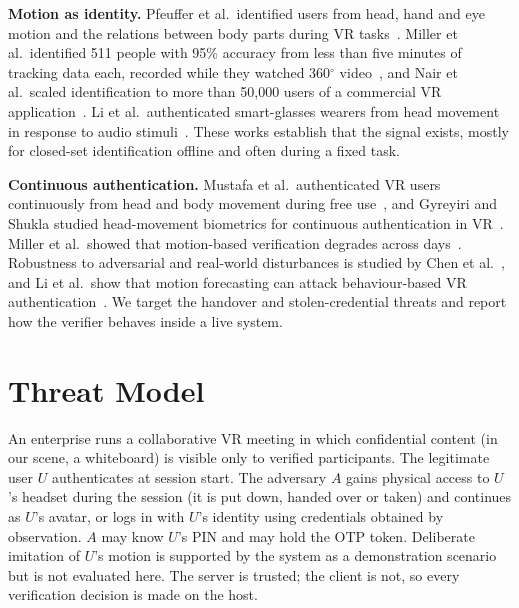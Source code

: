 \textbf{Motion as identity.} Pfeuffer et al.\ identified users from head, hand and eye motion and the relations between body parts during VR tasks~\cite{pfeuffer2019}. Miller et al.\ identified 511 people with 95\% accuracy from less than five minutes of tracking data each, recorded while they watched 360$^{\circ}$ video~\cite{miller2020}, and Nair et al.\ scaled identification to more than 50{,}000 users of a commercial VR application~\cite{nair2023}. Li et al.\ authenticated smart-glasses wearers from head movement in response to audio stimuli~\cite{li2016}. These works establish that the signal exists, mostly for closed-set identification offline and often during a fixed task.

\textbf{Continuous authentication.} Mustafa et al.\ authenticated VR users continuously from head and body movement during free use~\cite{mustafa2018}, and Gyreyiri and Shukla studied head-movement biometrics for continuous authentication in VR~\cite{gyreyiri2025}. Miller et al.\ showed that motion-based verification degrades across days~\cite{miller2022}. Robustness to adversarial and real-world disturbances is studied by Chen et al.~\cite{chen2024}, and Li et al.\ show that motion forecasting can attack behaviour-based VR authentication~\cite{li2026}. We target the handover and stolen-credential threats and report how the verifier behaves inside a live system.

\section{Threat Model}
\label{sec:threat}
An enterprise runs a collaborative VR meeting in which confidential content (in our scene, a whiteboard) is visible only to verified participants. The legitimate user $U$ authenticates at session start. The adversary $A$ gains physical access to $U$'s headset during the session (it is put down, handed over or taken) and continues as $U$'s avatar, or logs in with $U$'s identity using credentials obtained by observation. $A$ may know $U$'s PIN and may hold the OTP token. Deliberate imitation of $U$'s motion is supported by the system as a demonstration scenario but is not evaluated here. The server is trusted; the client is not, so every verification decision is made on the host.


